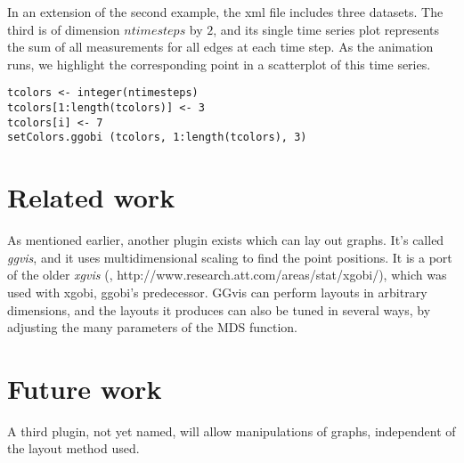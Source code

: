 \documentclass[11pt]{article}
\begin{document}
In an extension of the second example, the xml file includes three
datasets.  The third is of dimension $ntimesteps$ by $2$, and its
single time series plot represents the sum of all measurements
for all edges at each time step.  As the animation runs,
we highlight the corresponding point in a scatterplot of this time series.

\begin{verbatim}
tcolors <- integer(ntimesteps)
tcolors[1:length(tcolors)] <- 3
tcolors[i] <- 7
setColors.ggobi (tcolors, 1:length(tcolors), 3)
\end{verbatim}

\section{Related work}

As mentioned earlier, another plugin exists which can lay out
graphs.  It's called {\em ggvis}, and it uses multidimensional
scaling to find the point positions.  It is a port of the older
{\em xgvis} (\cite{xgvis_jcgs2002}, http://www.research.att.com/areas/stat/xgobi/), which
was used with xgobi, ggobi's predecessor.  GGvis can perform layouts in
arbitrary dimensions, and the layouts it produces can also be tuned in
several ways, by adjusting the many parameters of the MDS function.

\section{Future work}

A third plugin, not yet named, will allow manipulations of
graphs, independent of the layout method used.


\end{document}
